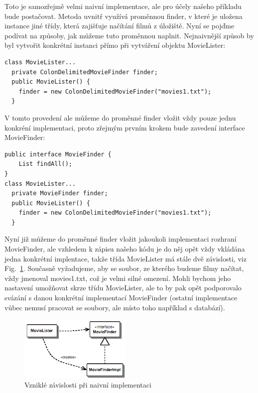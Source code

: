 \documentclass[a4paper,conference]{IEEEtran}
\newcommand{\fig}[1]{Fig.~\ref{fig:#1}}      %
\begin{document}
Toto je samozřejmě velmi naivní implementace, ale pro účely našeho příkladu bude postačovat. Metoda uvnitř využívá proměnnou finder, v které je uložena instance jiné třídy, která zajišťuje načítání filmů z úložiště. Nyní se pojďme podívat na způsoby, jak můžeme tuto proměnnou naplnit.
Nejnaivnější způsob by byl vytvořit konkrétní instanci přímo při vytváření objektu MovieLister:

\begin{lstlisting}
class MovieLister...
  private ColonDelimitedMovieFinder finder;
  public MovieLister() {
    finder = new ColonDelimitedMovieFinder("movies1.txt");
  }
\end{lstlisting}

V tomto provedení ale můžeme do proměnné finder vložit vždy pouze jednu konkréní implementaci, proto zřejmým prvním krokem bude zavedení interface MovieFinder: 

\lstset{language=Java, caption=Naplnění proměnné finder s využitím interface, label=listing:Java}
\begin{lstlisting}
public interface MovieFinder {
    List findAll();
}
class MovieLister...
  private MovieFinder finder;
  public MovieLister() {
    finder = new ColonDelimitedMovieFinder("movies1.txt");
  }
\end{lstlisting}

Nyní již můžeme do proměnné finder vložit jakoukoli implementaci rozhraní MovieFinder, ale vzhledem k zápisu našeho kódu je do něj opět vždy vkládána jedna konkrétní implentace, takže třída MovieLister má stále dvě závislosti, viz \fig{naive}. Současně vyžadujeme, aby se soubor, ze kterého budeme filmy načítat, vždy jmenoval movies1.txt, což je velmi silné omezení. Mohli bychom jeho nastavení umožňovat skrze třídu MovieLister, ale to by pak opět podporovalo svázání s danou konkrétní implementací MovieFinder (ostatní implementace vůbec nemusí pracovat se soubory, ale místo toho například s databází).

\begin{figure}[!b]
\centering
\includegraphics[width=2.1in]{1-Naive}
\caption{Vzniklé závislosti při naivní implementaci}
\label{fig:naive}
\end{figure}
\end{document}
